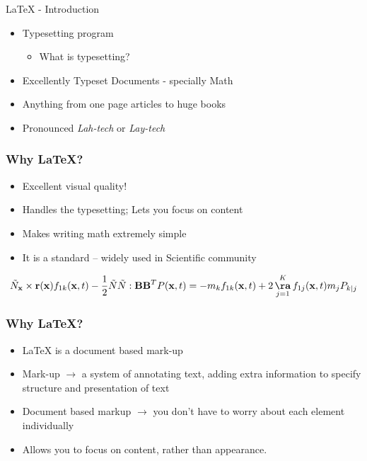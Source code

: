 \documentclass[12pt,compress]{beamer}
\begin{document}
\begin{frame}[fragile]
  \begin{block}{{\LaTeX} - Introduction}
    \begin{itemize}
      \item Typesetting program
       \begin{itemize}
         \item What is typesetting?
       \end{itemize}
      \item Excellently Typeset Documents - specially Math
      \item Anything from one page articles to huge books
      \item Pronounced \emph{Lah-tech} or \emph{Lay-tech}
    \end{itemize}
  \end{block}
\end{frame}

\begin{frame}[fragile]
  \frametitle{Why \LaTeX?}
  \begin{itemize}
  \item Excellent visual quality! 
  \item Handles the typesetting; Lets you focus on content
  \item Makes writing math extremely simple
  \item It is a standard -- widely used in Scientific community
  \end{itemize}
  \begin{block}{}
    \[\tilde{N}_{\mathbf{x}}\times \mathbf{r}(\mathbf{x}) f_{1k}(\mathbf{x},t) - \frac{1}{2} \tilde{N} \tilde{N}:\mathbf{BB}^{T}P(\mathbf{x},t) = -m_{k}f_{1k}(\mathbf{x},t) + 2 \mathop{\mathbf{\aa}}_{j=1}^{K} f_{1j}(\mathbf{x},t)m_{j}P_{k|j} \]
  \end{block}
\end{frame}

\begin{frame}[fragile]
  \frametitle{Why \LaTeX?}
  \begin{itemize}
  \item {\LaTeX} is a document based mark-up
  \item Mark-up $\rightarrow$ a system of annotating text, adding extra
    information to specify structure and presentation of text
  \item Document based markup $\rightarrow$ you don't have to worry
    about each element individually 
  \item Allows you to focus on content, rather than appearance.
  \end{itemize}
\end{frame}
\end{document}
